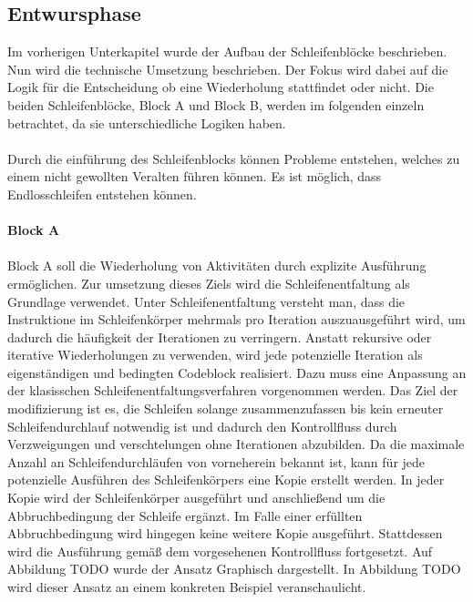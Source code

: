 \documentclass{article}
\begin{document}
    \subsection{Entwursphase}
    Im vorherigen Unterkapitel wurde der Aufbau der Schleifenblöcke beschrieben. Nun wird die technische Umsetzung beschrieben. 
    Der Fokus wird dabei auf die Logik für die Entscheidung ob eine Wiederholung stattfindet oder nicht.
    Die beiden Schleifenblöcke, Block A und Block B, werden im folgenden einzeln betrachtet, da sie unterschiedliche Logiken haben. \\
    \\
    Durch die einführung des Schleifenblocks können Probleme entstehen, welches zu einem nicht gewollten Veralten führen können.
    Es ist möglich, dass Endlosschleifen entstehen können.\\
    \\
    \textbf{Block A}\\
    \\
    Block A soll die Wiederholung von Aktivitäten durch explizite Ausführung ermöglichen.
    Zur umsetzung dieses Ziels wird die Schleifenentfaltung als Grundlage verwendet.
    Unter Schleifenentfaltung versteht man, dass die Instruktione im Schleifenkörper mehrmals pro Iteration auszuausgeführt wird, um dadurch die häufigkeit der Iterationen zu verringern. \cite{9}
    Anstatt rekursive oder iterative Wiederholungen zu verwenden, wird jede potenzielle Iteration als eigenständigen und bedingten Codeblock realisiert.
    Dazu muss eine Anpassung an der klasisschen Schleifenentfaltungsverfahren vorgenommen werden. 
    Das Ziel der modifizierung ist es, die Schleifen solange zusammenzufassen bis kein erneuter Schleifendurchlauf notwendig ist und dadurch den Kontrollfluss durch Verzweigungen und verschtelungen ohne Iterationen abzubilden.
    Da die maximale Anzahl an Schleifendurchläufen von vorneherein bekannt ist, kann für jede potenzielle Ausführen des Schleifenkörpers eine Kopie erstellt werden. 
    In jeder Kopie wird der Schleifenkörper ausgeführt und anschließend um die Abbruchbedingung der Schleife ergänzt. Im Falle einer erfüllten Abbruchbedingung wird hingegen keine weitere Kopie ausgeführt. 
    Stattdessen wird die Ausführung gemäß dem vorgesehenen Kontrollfluss fortgesetzt.
    Auf Abbildung TODO wurde der Ansatz Graphisch dargestellt.
    In Abbildung TODO wird dieser Ansatz an einem konkreten Beispiel veranschaulicht.
\end{document}
